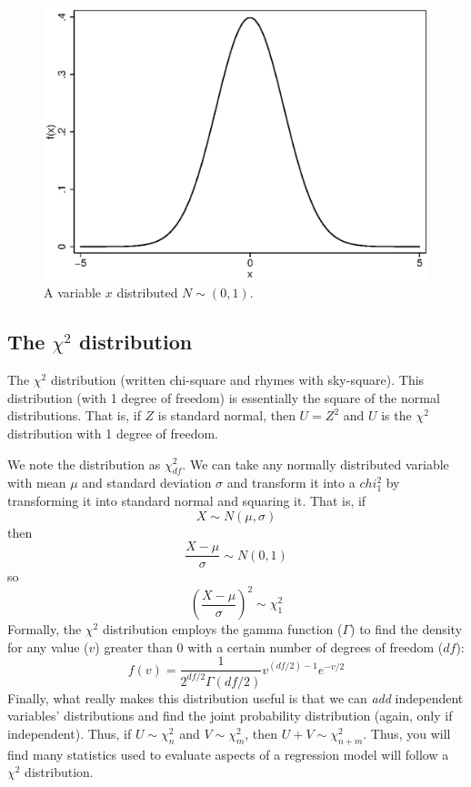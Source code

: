 \begin{figure}
   \centering
   \includegraphics[angle=0,
           width=.75\textwidth]{normal.eps}
   \caption{A variable $x$ distributed $N \sim \left(0,1\right)$.}
  \label{fig:normal}
\end{figure}

\subsection{The $\chi^2$ distribution}

The $\chi^2$ distribution (written chi-square and rhymes with sky-square). This distribution (with 1 degree of freedom) is essentially the square of the normal distributions. That is, if $Z$ is standard normal, then $U = Z^2$ and $U$ is the $\chi^2$ distribution with 1 degree of freedom.

We note the distribution as $\chi_{df}^2$. We can take any normally distributed variable with mean $\mu$ and standard deviation $\sigma$ and transform it into a $chi_1^2$ by transforming it into standard normal and squaring it. That is, if
\[
X \sim N\left(\mu,\sigma\right)
\]
then
\[
\frac{X-\mu}{\sigma} \sim N\left(0,1\right)
\]
so
\[
\left(\frac{X-\mu}{\sigma}\right)^2 \sim \chi_1^2
\]
Formally, the $\chi^2$ distribution employs the gamma function ($\Gamma$) to find the density for any value ($v$) greater than 0 with a certain number of degrees of freedom ($df$):
\begin{equation}
f(v) = \frac{1}{2^{df/2}\Gamma\left(df/2\right)}v^{\left(df/2\right)-1}e^{-v/2}
\end{equation}
Finally, what really makes this distribution useful is that we can {\it add} independent variables' distributions and find the joint probability distribution (again, only if independent). Thus, if $U \sim \chi_n^2$ and $V \sim \chi_m^2$, then $U + V \sim \chi_{n+m}^2$. Thus, you will find many statistics used to evaluate aspects of a regression model will follow a $\chi^2$ distribution.

